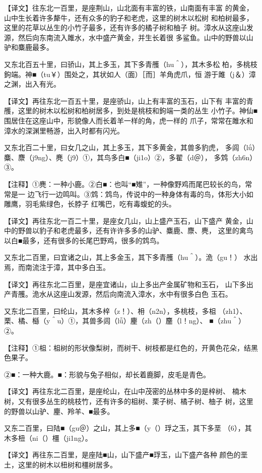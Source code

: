 \documentclass[a4paper,12pt,UTF8,twoside]{ctexbook}
\begin{document}
【译文】往东北一百里，是座荆山，山北面有丰富的铁，山南面有丰富 的黄金，山中生长着许多犛牛，还有众多的豹子和老虎，这里的树木以松树 和柏树最多，这里的花草以丛生的小竹子最多，还有许多的橘子树和柚子 树。漳水从这座山发源，然后向东南流入雎水，水中盛产黄金，并生长着很 多鲨鱼。山中的野兽以山驴和麋鹿最多。

又东北百五十里，曰骄山，其上多玉，其下多青雘（hu＾），其木多松 柏，多桃枝鉤端。神■（tu￥）围处之，其状如人（面）［而］羊角虎爪，恒 游于雎（j＆）漳之渊，出入有光。

【译文】再往东北一百五十里，是座骄山，山上有丰富的玉石，山下有 丰富的青雘，这里的树木以松树和柏树居多，到处是桃枝和鉤端一类的丛生 小竹子。神仙■围居住在这座山中，形貌像人而长着羊一样的角，虎一样的 爪子，常常在雎水和漳水的深渊里畅游，出入时都有闪光。

又东北百二十里，曰女几之山，其上多玉，其下多黄金，其兽多豹虎， 多闾（lǘ）麋、麖（j9ng）、麂（j9）①，其鸟多白■（ji1o）②，多翟（d＠）， 多鸩（zh6n）③。

【注释】①麂：一种小鹿。②白■：也叫“■雉”，一种像野鸡而尾巴较长的鸟，常常是一 边飞行一边鸣叫。③鸩：鸩鸟，传说中的一种身体有毒的鸟，体形大小如雕鹰，羽毛紫绿色，长脖子 红嘴巴，吃有毒蝮蛇的头。

【译文】再往东北一百二十里，是座女几山，山上盛产玉石，山下盛产 黄金，山中的野兽以豹子和老虎最多，还有许许多多的山驴、麋鹿、麖、麂， 这里的禽鸟以白■最多，还有很多的长尾巴野鸡，很多的鸩鸟。

又东北二百里，曰宜诸之山，其上多金玉，其下多青雘（hu＾）。洈（gu！） 水出焉，而南流注于漳，其中多白玉。

【译文】再往东北二百里，是座宜诸山，山上多出产金属矿物和玉石， 山下多出产青雘。洈水从这座山发源，然后向南流入漳水，水中有很多白色 玉石。

又东北二百里，曰纶山，其木多梓（z！）、枏（n2n），多桃枝，多柤 （zh1）、栗、橘、櫾（y＾u）①，其兽多闾（lǚ）麈（zh（）麢（l！ng）、 ■（zhu＾）②。

【注释】①柤：柤树的形状像梨树，而树干、树枝都是红色的，开黄色花朵，结黑色果子。

②■：一种大鹿。■：形貌与兔子相似，却长着鹿脚，皮毛是青色。

【译文】再往东北二百里，是座纶山，在山中茂密的丛林中多的是梓树、 楠木树，又有很多丛生的桃枝竹，还有许多的柤树、栗子树、橘子树、柚子 树，这里的野兽以山驴、麈、羚羊、■最多。

又东二百里，曰陆■（gu＠）之山，其上多■（y（）琈之玉，其下多垩 （6），其木多杻（ni（）橿（ji1ng）。

【译文】再往东二百里，是座陆■山，山下盛产■琈玉，山下盛产各种 颜色的垩土，这里的树木以杻树和橿树居多。
\end{document}
